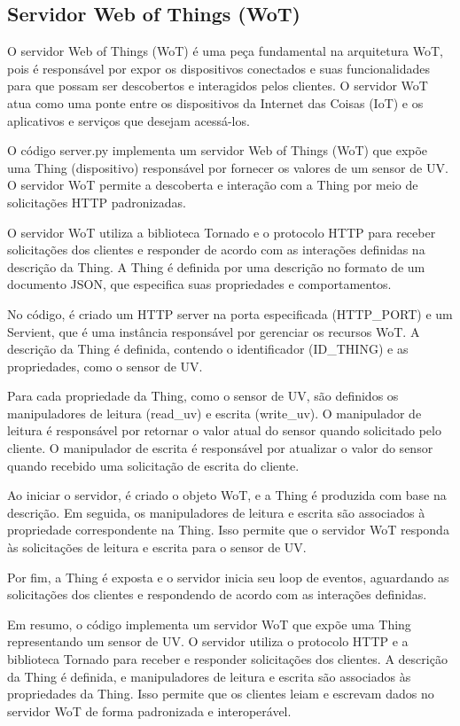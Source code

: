 \subsection{Servidor Web of Things (WoT)}

O servidor Web of Things (WoT) é uma peça fundamental na arquitetura WoT, pois é responsável por expor os dispositivos conectados e suas funcionalidades para que possam ser descobertos e interagidos pelos clientes. O servidor WoT atua como uma ponte entre os dispositivos da Internet das Coisas (IoT) e os aplicativos e serviços que desejam acessá-los.

O código server.py  implementa um servidor Web of Things (WoT) que expõe uma Thing (dispositivo) responsável por fornecer os valores de um sensor de UV. O servidor WoT permite a descoberta e interação com a Thing por meio de solicitações HTTP padronizadas.

O servidor WoT utiliza a biblioteca Tornado e o protocolo HTTP para receber solicitações dos clientes e responder de acordo com as interações definidas na descrição da Thing. A Thing é definida por uma descrição no formato de um documento JSON, que especifica suas propriedades e comportamentos.

No código, é criado um HTTP server na porta especificada (HTTP_PORT) e um Servient, que é uma instância responsável por gerenciar os recursos WoT. A descrição da Thing é definida, contendo o identificador (ID_THING) e as propriedades, como o sensor de UV.

Para cada propriedade da Thing, como o sensor de UV, são definidos os manipuladores de leitura (read_uv) e escrita (write_uv). O manipulador de leitura é responsável por retornar o valor atual do sensor quando solicitado pelo cliente. O manipulador de escrita é responsável por atualizar o valor do sensor quando recebido uma solicitação de escrita do cliente.

Ao iniciar o servidor, é criado o objeto WoT, e a Thing é produzida com base na descrição. Em seguida, os manipuladores de leitura e escrita são associados à propriedade correspondente na Thing. Isso permite que o servidor WoT responda às solicitações de leitura e escrita para o sensor de UV.

Por fim, a Thing é exposta e o servidor inicia seu loop de eventos, aguardando as solicitações dos clientes e respondendo de acordo com as interações definidas.

Em resumo, o código implementa um servidor WoT que expõe uma Thing representando um sensor de UV. O servidor utiliza o protocolo HTTP e a biblioteca Tornado para receber e responder solicitações dos clientes. A descrição da Thing é definida, e manipuladores de leitura e escrita são associados às propriedades da Thing. Isso permite que os clientes leiam e escrevam dados no servidor WoT de forma padronizada e interoperável.

